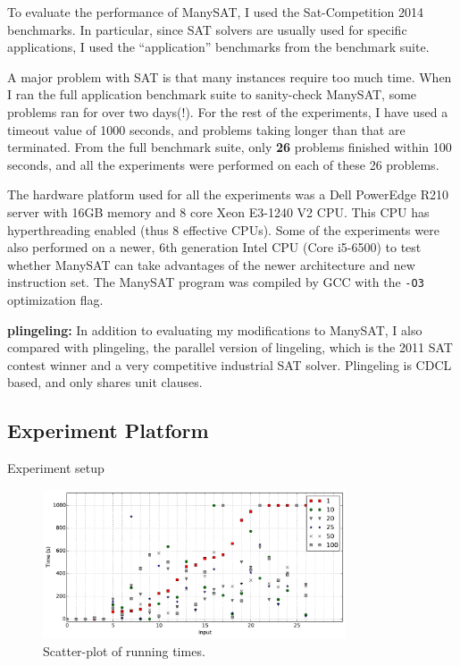 \documentclass{article}
\begin{document}
To evaluate the performance of ManySAT, I used the Sat-Competition
2014~\cite{sc14} benchmarks. In particular, since SAT solvers are
usually used for specific applications, I used the ``application''
benchmarks from the benchmark suite.


A major problem with SAT is that many instances require too much
time. When I ran the full application benchmark suite to sanity-check
ManySAT, some problems ran for over two days(!). For the rest of the
experiments, I have used a timeout value of 1000 seconds, and problems
taking longer than that are terminated. From the full benchmark suite,
only \textbf{26} problems finished within 100 seconds, and all the
experiments were performed on each of these 26 problems.


The hardware platform used for all the experiments was a Dell
PowerEdge R210 server with 16GB memory and 8 core Xeon E3-1240 V2
CPU. This CPU has hyperthreading enabled (thus 8 effective CPUs). Some
of the experiments were also performed on a newer, 6th generation
Intel CPU (Core i5-6500) to test whether ManySAT can take advantages
of the newer architecture and new instruction set. The ManySAT program
was compiled by GCC with the \texttt{-O3} optimization flag.


\textbf{plingeling:} In addition to evaluating my modifications to
ManySAT, I also compared with plingeling, the parallel version of
lingeling, which is the 2011 SAT contest winner and a very competitive
industrial SAT solver. Plingeling is CDCL based, and only shares unit
clauses.



\subsection{Experiment Platform}
Experiment setup

\begin{figure}[h]
  \centering
  \includegraphics[width=0.8\textwidth]{../figs/scatter_all.pdf}
  \caption{Scatter-plot of running times.}
  \label{fig:scatter-1}
\end{figure}
\end{document}

